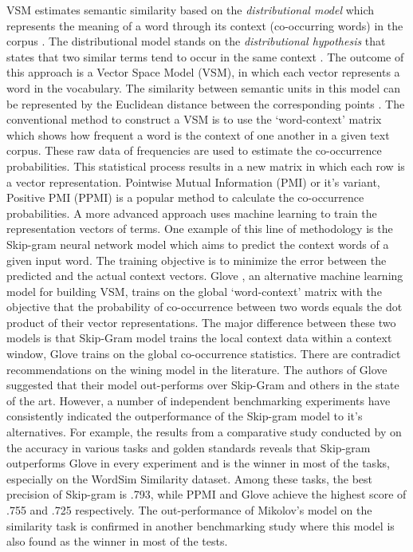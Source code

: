 \documentclass[Journal, BackFigs,NoLists, DoubleSpace]{ascelike}%
\begin{document}
VSM estimates semantic similarity based on the \textit{distributional model} which represents the meaning of a word through its context (co-occurring words) in the corpus \cite{erk12}. The distributional model stands on the \textit{distributional hypothesis} that states that two similar terms tend to occur in the same context \cite{Harris54}. The outcome of this approach is a Vector Space Model (VSM), in which each vector represents a word in the vocabulary. The similarity between semantic units in this model can be represented by the Euclidean distance between the corresponding points \cite{erk12}. The conventional method to construct a VSM is to use the `word-context' matrix which shows how frequent a word is the context of one another in a given text corpus. These raw data of frequencies are used to estimate the co-occurrence probabilities. This statistical process results in a new matrix in which each row is a vector representation. Pointwise Mutual Information (PMI) \cite{church90} or it's variant, Positive PMI (PPMI) is a popular method to calculate the co-occurrence probabilities. A more advanced approach uses machine learning to train the representation vectors of terms. One example of this line of methodology is the Skip-gram neural network model \cite{mikolov13a} which aims to predict the context words of a given input word. The training objective is to minimize the error between the predicted and the actual context vectors. Glove \cite{pennington2014glove}, an alternative machine learning model for building VSM, trains on the global `word-context' matrix with the objective that the probability of co-occurrence between two words equals the dot product of their vector representations. The major difference between these two models is that Skip-Gram model trains the local context data within a context window, Glove trains on the global co-occurrence statistics. There are contradict recommendations on the wining model in the literature. The authors of Glove suggested that their model out-performs over Skip-Gram and others in the state of the art. However, a number of independent benchmarking experiments have consistently indicated the outperformance of the Skip-gram model to it's alternatives. For example, the results from a comparative study conducted by  on the accuracy in various tasks and golden standards reveals that Skip-gram outperforms Glove in every experiment and is the winner in most of the tasks, especially on the WordSim Similarity dataset. Among these tasks, the best precision of Skip-gram is .793, while PPMI and Glove achieve the highest score of .755 and .725 respectively.  The out-performance of Mikolov's model on the similarity task is confirmed in another benchmarking study \cite{hill15} where this model is also found as the winner in most of the tests. 
\end{document}
